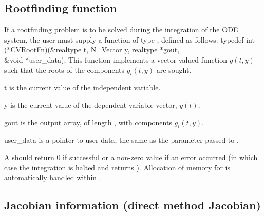 \subsection{Rootfinding function}\label{ss:rootFn}
If a rootfinding problem is to be solved during the integration of the ODE system,
the user must supply a {\CC} function of type , defined as follows:
{
  typedef int (*CVRootFn)(&realtype t, N\_Vector y, realtype *gout, \\
                          &void *user\_data);
}
{
  This function implements a vector-valued function $g(t,y)$ such that the roots of
  the  components $g_i(t,y)$ are sought.
}
{
  \begin{args}
  \item[t]
    is the current value of the independent variable.
  \item[y]
    is the current value of the dependent variable vector, $y(t)$.
  \item[gout]
    is the output array, of length , with components $g_i(t,y)$.
  \item[user\_data]
    is a pointer to user data, the same as the 
    parameter passed to .
  \end{args}
}
{
  A  should return 0 if successful or a non-zero value if
  an error occurred (in which case the integration is halted and  returns
  ).
}
{
  Allocation of memory for  is automatically handled within {\cvode}.
}


\subsection{Jacobian information (direct method Jacobian)}
\label{ss:jacFn}

